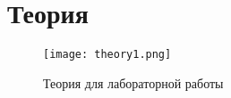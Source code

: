 \chapter{Теория}
\label{ch:intro}

\begin{figure}[H]
    \centering
    \texttt{[image: theory1.png]}
    \caption{Теория для лабораторной работы}
\end{figure}


\endinput